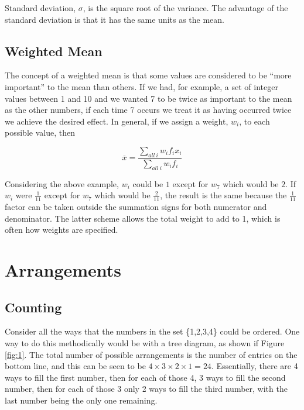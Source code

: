 \documentclass[a5paper]{article}
\begin{document}
Standard deviation, $\sigma$, is the square root of the variance. The advantage
of the standard deviation is that it has the same units as the mean.

\subsection{Weighted Mean}

The concept of a weighted mean is that some values are considered to be ``more
important'' to the mean than others. If we had, for example, a set of integer
values between 1 and 10 and we wanted 7 to be twice as important to the mean as
the other numbers, if each time 7 occurs we treat it as having occurred twice we
achieve the desired effect. In general, if we assign a weight, $w_i$, to each
possible value, then

\begin{equation}
  \overline{x} = \frac{\sum\limits_{all\ i} w_i f_i x_i}{\sum\limits_{all\ i}
    w_i f_i}
\end{equation}

Considering the above example, $w_i$ could be $1$ except for $w_7$ which would
be $2$. If $w_i$ were $\frac{1}{11}$ except for $w_7$ which would be
$\frac{2}{11}$, the result is the same because the $\frac{1}{11}$ factor can be
taken outside the summation signs for both numerator and denominator. The latter
scheme allows the total weight to add to 1, which is often how weights are
specified.

\section{Arrangements}

\subsection{Counting}

Consider all the ways that the numbers in the set \{1,2,3,4\} could be ordered.
One way to do this methodically would be with a tree diagram, as shown if Figure
\ref{fig:1}. The total number of possible arrangements is the number of entries
on the bottom line, and this can be seen to be $4\times 3\times 2\times 1 = 24$.
Essentially, there are 4 ways to fill the first number, then for each of those
4, 3 ways to fill the second number, then for each of those 3 only 2 ways to
fill the third number, with the last number being the only one remaining.
\end{document}
